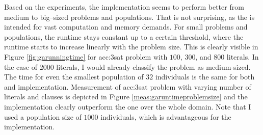 Based on the experiments, the \cuda implementation seems to perform better from medium to big--sized problems and populations. That is not surprising, as the \gpu is intended for vast computation and memory demands. For small problems and populations, the runtime stays constant up to a certain threshold, where the runtime starts to increase linearly with the problem size. This is clearly visible in Figure \ref{fig:garunningtime} for \acrshort{acc:3sat} problem with $100$, $300$, and $800$ literals. In the case of $2000$ literals, I would already classify the problem as medium-sized. The time for even the smallest population of $32$ individuals is the same for both \cpu and \gpu implementation. Measurement of \acrshort{acc:3sat} problem with varying number of literals and clauses is depicted in Figure \ref{meas:garuntimeproblemsize} and the \gpu implementation clearly outperform the \cpu one over the whole domain. Note that I used a population size of $1000$ individuals, which is advantageous for the \gpu implementation.

